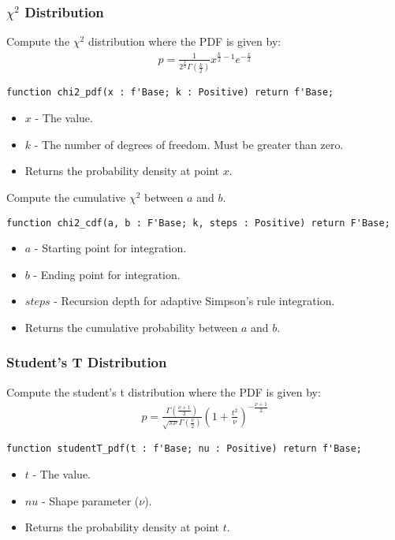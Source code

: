 \documentclass[10pt, openany]{book}
\begin{document}
\subsubsection{$\chi^2$ Distribution}
Compute the $\chi^2$ distribution where the PDF is given by:
\begin{align*}
  p = \frac{1}{2^{\frac{k}{2}}\Gamma(\frac{k}{2})}x^{\frac{k}{2}-1}e^{-\frac{x}{2}}
\end{align*}
\begin{lstlisting}
function chi2_pdf(x : f'Base; k : Positive) return f'Base;
\end{lstlisting}
\begin{itemize}
  \item $x$ - The value.
  \item $k$ - The number of degrees of freedom.  Must be greater than zero.
  \item Returns the probability density at point $x$.
\end{itemize}

Compute the cumulative $\chi^2$ between $a$ and $b$.
\begin{lstlisting}
function chi2_cdf(a, b : F'Base; k, steps : Positive) return F'Base;
\end{lstlisting}
\begin{itemize}
  \item $a$ - Starting point for integration.
  \item $b$ - Ending point for integration.
  \item $steps$ - Recursion depth for adaptive Simpson's rule integration.
  \item Returns the cumulative probability between $a$ and $b$.
\end{itemize}

\subsubsection{Student's T Distribution}
Compute the student's t distribution where the PDF is given by:
\begin{align*}
  p = \frac{\Gamma(\frac{\nu+1}{2})}{\sqrt{\pi\nu}\Gamma(\frac{\nu}{2})}(1+\frac{t^2}{\nu})^{-\frac{\nu+1}{2}}
\end{align*}
\begin{lstlisting}
function studentT_pdf(t : f'Base; nu : Positive) return f'Base;
\end{lstlisting}
\begin{itemize}
  \item $t$ - The value.
  \item $nu$ - Shape parameter ($\nu$).
  \item Returns the probability density at point $t$.
\end{itemize}
\end{document}
